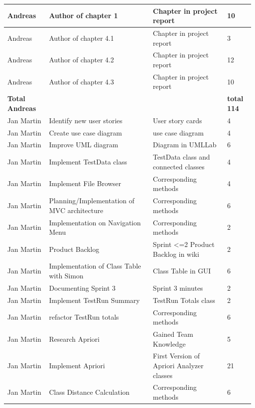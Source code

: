 \begin{longtable}{|p{}||p{}|p{}|p{}|}
    \hline
    Andreas & Author of chapter 1 & Chapter in project report & 10 \\ 
    \hline
    Andreas & Author of chapter 4.1 & Chapter in project report & 3 \\ 
    \hline
    Andreas & Author of chapter 4.2 & Chapter in project report & 12 \\
    \hline 
    Andreas & Author of chapter 4.3 & Chapter in project report & 10 \\ 
    \hline
    \hline 
    \textbf{Total \newline Andreas} & & & \textbf{total 114}   \\
    \hline
    \hline
    Jan Martin & Identify new user stories & User story cards & 4 \\
    \hline
    Jan Martin & Create use case diagram & use case diagram & 4 \\ 
    \hline
    Jan Martin & Improve UML diagram & Diagram in UMLLab & 6 \\ 
    \hline  
    Jan Martin & Implement TestData class & TestData class and connected classes & 4 \\ 
    \hline  
    Jan Martin & Implement File Browser & Corresponding methods & 4 \\ 
    \hline
    Jan Martin & Planning/Implementation of MVC architecture & Corresponding methods & 6 \\ 
    \hline  
    Jan Martin & Implementation on Navigation Menu & Corresponding methods & 2 \\ 
    \hline  
    Jan Martin & Product Backlog & Sprint <=2 Product Backlog in wiki & 2 \\ 
    \hline  
    Jan Martin & Implementation of Class Table with Simon & Class Table in GUI & 6 \\ 
    \hline  
    Jan Martin & Documenting Sprint 3 & Sprint 3 minutes & 2 \\ 
    \hline 
    Jan Martin & Implement TestRun Summary & TestRun Totals class & 2 \\ 
    \hline  
    Jan Martin & refactor TestRun totals & Corresponding methods & 6 \\ 
    \hline  
    Jan Martin & Research Apriori & Gained Team Knowledge & 5 \\ 
    \hline  
    Jan Martin & Implement Apriori & First Version of Apriori Analyzer classes & 21 \\ 
    \hline  
    Jan Martin & Class Distance Calculation & Corresponding methods & 6 \\ 

\end{longtable}
